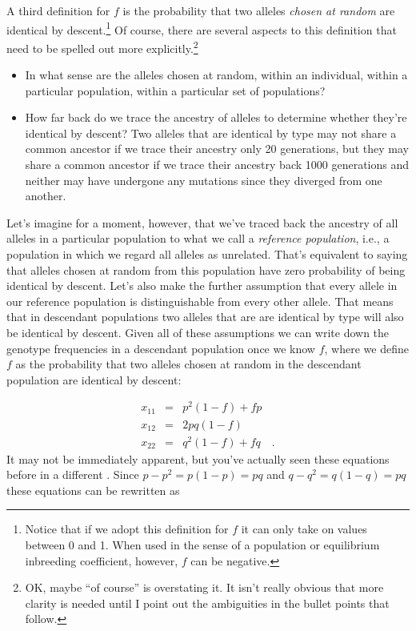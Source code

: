 A third definition for $f$ is the probability that two alleles {\it
chosen at random\/} are identical by descent.\footnote{Notice that if
we adopt this definition for $f$ it can only take on values between 0
and 1. When used in the sense of a population or equilibrium
inbreeding coefficient, however, $f$ can be negative.}  Of course,
there are several aspects to this definition that need to be spelled
out more explicitly.\footnote{OK, maybe ``of course'' is overstating
  it. It isn't really obvious that more clarity is needed until I
  point out the ambiguities in the bullet points that follow.}

\begin{itemize}

\item In what sense are the alleles chosen at random, within an
individual, within a particular population, within a particular set of
populations? 

\item How far back do we trace the ancestry of alleles to determine
whether they're identical by descent? Two alleles that are identical
by type may not share a common ancestor if we trace their ancestry
only 20 generations, but they may share a common ancestor if we trace
their ancestry back 1000 generations and neither may have undergone
any mutations since they diverged from one another.

\end{itemize}

Let's imagine for a moment, however, that we've traced back the
ancestry of all alleles in a particular population to what we call a
{\it reference population\/}, i.e., a population in which we regard
all alleles as unrelated. That's equivalent
to saying that alleles chosen at random from this population have zero
probability of being identical by descent. Let's also make the further
assumption that every allele in our reference population is
distinguishable from every other allele. That means that in descendant
populations two alleles that are are identical by type will also be
identical by descent. Given all of these assumptions we can write down
the genotype frequencies in a descendant population once we know $f$,
where we define $f$ as the probability that two alleles chosen at
random in the descendant population are identical by descent:

\begin{eqnarray}
x_{11} &=& p^2(1-f) + fp \\
x_{12} &=& 2pq(1-f) \\
x_{22} &=& q^2(1-f) + fq \quad .
\end{eqnarray}
It may not be immediately apparent, but you've actually seen
these equations before in a different
.
Since $p - p^2 = p(1-p) = pq$ and $q - q^2 = q(1-q) = pq$ these
equations can be rewritten as

